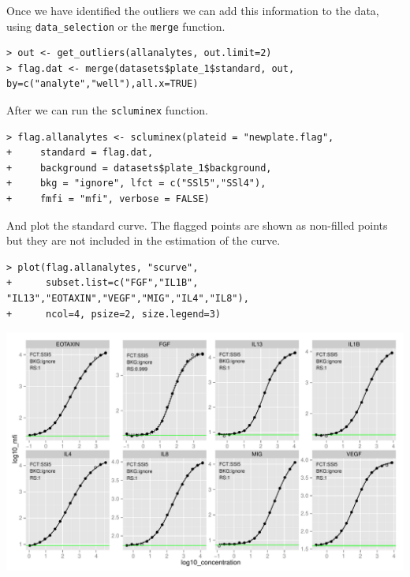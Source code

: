 \documentclass[11pt]{article}\usepackage[]{graphicx}\usepackage[]{color}
\makeatletter
\def\maxwidth{ %
  \ifdim\Gin@nat@width>\linewidth
    \linewidth
  \else
    \Gin@nat@width
  \fi
}
\newenvironment{kframe}{%
 \def\at@end@of@kframe{}%
 \ifinner\ifhmode%
  \def\at@end@of@kframe{\end{minipage}}%
  \begin{minipage}{\columnwidth}%
 \fi\fi%
 \def\FrameCommand##1{\hskip\@totalleftmargin \hskip-\fboxsep
 \colorbox{shadecolor}{##1}\hskip-\fboxsep
     \hskip-\linewidth \hskip-\@totalleftmargin \hskip\columnwidth}%
 \MakeFramed {\advance\hsize-\width
   \@totalleftmargin\z@ \linewidth\hsize
   \@setminipage}}%
 {\par\unskip\endMakeFramed%
 \at@end@of@kframe}
\newenvironment{knitrout}{}{} %
\makeatother
\begin{document}
\noindent Once we have identified the outliers we can add this information
to the data, using {\tt data\_selection} or the {\tt merge} function. 

\begin{knitrout}
\color{fgcolor}\begin{kframe}
\begin{verbatim}
> out <- get_outliers(allanalytes, out.limit=2)
> flag.dat <- merge(datasets$plate_1$standard, out, by=c("analyte","well"),all.x=TRUE)
\end{verbatim}
\end{kframe}
\end{knitrout}

\noindent After we can run the {\tt scluminex} function.
\begin{knitrout}
\color{fgcolor}\begin{kframe}
\begin{verbatim}
> flag.allanalytes <- scluminex(plateid = "newplate.flag", 
+     standard = flag.dat, 
+     background = datasets$plate_1$background,
+     bkg = "ignore", lfct = c("SSl5","SSl4"), 
+     fmfi = "mfi", verbose = FALSE)
\end{verbatim}
\end{kframe}
\end{knitrout}

\noindent And plot the standard curve. The flagged points are shown as 
non-filled points but they are not included in the estimation of the curve.

\begin{knitrout}
\color{fgcolor}\begin{kframe}
\begin{verbatim}
> plot(flag.allanalytes, "scurve", 
+      subset.list=c("FGF","IL1B", "IL13","EOTAXIN","VEGF","MIG","IL4","IL8"),
+      ncol=4, psize=2, size.legend=3)
\end{verbatim}
\end{kframe}

{\centering \includegraphics[width=\maxwidth]{./unnamed-chunk-56-1} 

}



\end{knitrout}
\end{document}
